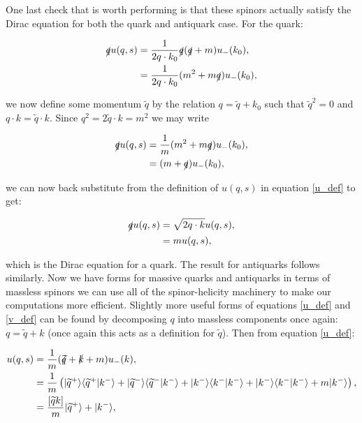 	One last check that is worth performing is that these spinors actually satisfy the Dirac equation for both the quark and antiquark case.  For the quark:

	\begin{subequations}
	\begin{align*}
		\slashed q u(q, s) &= \frac{1}{2q\cdot k_0}\slashed q(\slashed q + m)u_-(k_0), \\
		                   &= \frac{1}{2q\cdot k_0}(m^2 + m\slashed q)u_-(k_0), \\
	\end{align*}
	\end{subequations}

	we now define some momentum $\widetilde{q}$ by the relation $q = \widetilde{q} + k_0$ such that $\widetilde{q}^2=0$ and
	$q\cdot k = \widetilde{q}\cdot k$.  Since $q^2=2\widetilde{q}\cdot k=m^2$ we may write

	\begin{subequations}
	\begin{align*}
		\slashed q u(q, s) &= \frac{1}{m}(m^2 + m\slashed q)u_-(k_0), \\
		                   &= (m + \slashed q)u_-(k_0), \\
	\end{align*}
	\end{subequations}

	we can now back substitute from the definition of $u(q, s)$ in equation \ref{u_def} to get:

	\begin{subequations}
	\begin{align*}
		\slashed q u(q, s) &= \sqrt{2q\cdot k}u(q, s), \\
		                   &= mu(q,s), \\
	\end{align*}
	\end{subequations}

	which is the Dirac equation for a quark.  The result for antiquarks follows similarly.
	Now we have forms for massive quarks and antiquarks in terms of massless spinors we can
	use all of the spinor-helicity machinery to make our computations more efficient.  Slightly
	more useful forms of equations \ref{u_def} and \ref{v_def} can be found by decomposing $q$
	into massless components once again: $q=\widetilde{q}+k$ (once again this acts as a
	definition for $\widetilde{q}$).  Then from equation \ref{u_def}:

	\begin{subequations}
	\begin{align*}
		u(q, s) &= \frac{1}{m}(\slashed{\widetilde{q}} + \slashed{k} + m)u_-(k), \\
		        &= \frac{1}{m}\left(|\widetilde{q}^+ \rangle\langle \widetilde{q}^+|k^-\rangle +
		        |\widetilde{q}^- \rangle\langle \widetilde{q}^-|k^-\rangle + |k^- \rangle\langle k^-|k^-\rangle +
		        |k^- \rangle\langle k^-|k^-\rangle + m|k^-\rangle\right), \\
		        &= \frac{[\widetilde{q}k]}{m}|\widetilde{q}^+\rangle + |k^-\rangle,
	\end{align*}
	\end{subequations}

